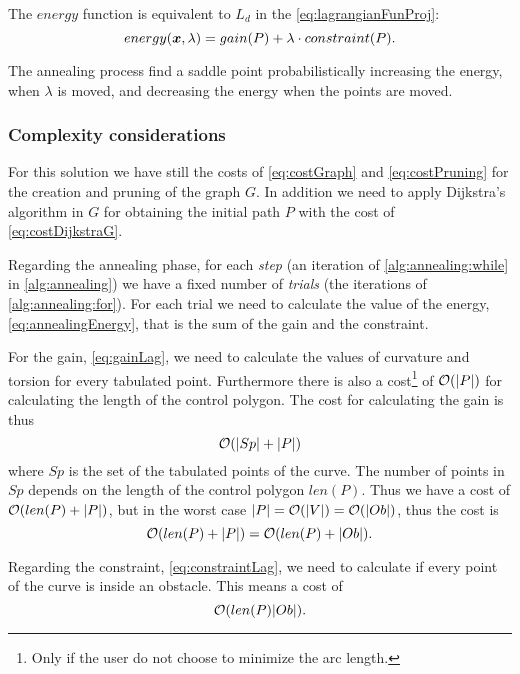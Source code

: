 \documentclass[dissertation.tex]{subfiles}
\begin{document}
The $energy$ function is equivalent to $L_d$ in the
\cref{eq:lagrangianFunProj}:
\begin{equation}
  \label{eq:annealingEnergy}
  energy(\boldsymbol{x},\lambda)=gain(P)+\lambda\cdot constraint(P).
\end{equation}

The annealing process
find a saddle point probabilistically increasing the energy, when
$\lambda$ is moved, and 
decreasing the energy when the points are moved.

\subsubsection{Complexity considerations}
For this solution we have still the costs of \cref{eq:costGraph} and
\cref{eq:costPruning} for
the creation and pruning of the graph $G$. In addition we need to
apply Dijkstra's
algorithm in $G$ for obtaining the initial path $P$ with the cost of
\cref{eq:costDijkstraG}.

Regarding the annealing phase, for each \emph{step} (an
iteration of \cref{alg:annealing:while} in \cref{alg:annealing}) we
have a fixed number of \emph{trials} (the iterations of \cref{alg:annealing:for}). For each trial we need to
calculate the value of the energy, \cref{eq:annealingEnergy}, that is
the sum of the gain and the constraint.

For the gain, \cref{eq:gainLag}, we need to calculate the values of
curvature and torsion for every tabulated point. Furthermore there is
also a cost\footnote{Only if
  the user do not choose to minimize the arc length.} of
$\mathcal{O}(|P|)$ for
calculating the length of the control polygon. The cost for
calculating the gain is thus
\begin{equation*}
  \mathcal{O}(|Sp|+|P|)
\end{equation*}
where $Sp$ is the set of the tabulated points of the curve. The number
of points in $Sp$ depends on the length of the control polygon
$len(P)$. Thus
we have a cost of $\mathcal{O}(len(P)+|P|)$, but in the worst case
$|P|=\mathcal{O}(|V|)=\mathcal{O}(|Ob|)$, thus the cost is
\newcommand{\eqCostGain}{\ensuremath{\bigO(len(P)+|P|)=\bigO(len(P)+|Ob|)}}
\begin{equation}
  \label{eq:costGain}
  \eqCostGain.
\end{equation}

Regarding the constraint, \cref{eq:constraintLag}, we need to calculate if
every point 
of the curve is inside an obstacle. This means a cost of
\newcommand{\eqCostConstraint}{\ensuremath{\bigO(len(P)|Ob|)}}
\begin{equation}
  \label{eq:costConstraint}
  \eqCostConstraint.
\end{equation}
\end{document}
